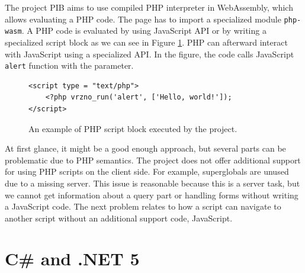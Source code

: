 The project PIB \cite{online:pib} aims to use compiled PHP interpreter in WebAssembly, which allows evaluating a PHP code.
The page has to import a specialized module \texttt{php-wasm}. 
A PHP code is evaluated by using JavaScript API or by writing a specialized script block as we can see in Figure \ref{img03:vrzno}.
PHP can afterward interact with JavaScript using a specialized API.
In the figure, the code calls JavaScript \texttt{alert} function with the parameter.
\par
\begin{figure}[H]
\begin{lstlisting}
<script type = "text/php">
	<?php vrzno_run('alert', ['Hello, world!']);
</script>
\end{lstlisting}
\caption{An example of PHP script block executed by the project.}
\label{img03:vrzno}
\end{figure}
\par
At first glance, it might be a good enough approach, but several parts can be problematic due to PHP semantics.
The project does not offer additional support for using PHP scripts on the client side.
For example, superglobals are unused due to a missing server.
This issue is reasonable because this is a server task, but we cannot get information about a query part or handling forms without writing a JavaScript code.
The next problem relates to how a script can navigate to another script without an additional support code, JavaScript.

\section{C\# and .NET 5}

